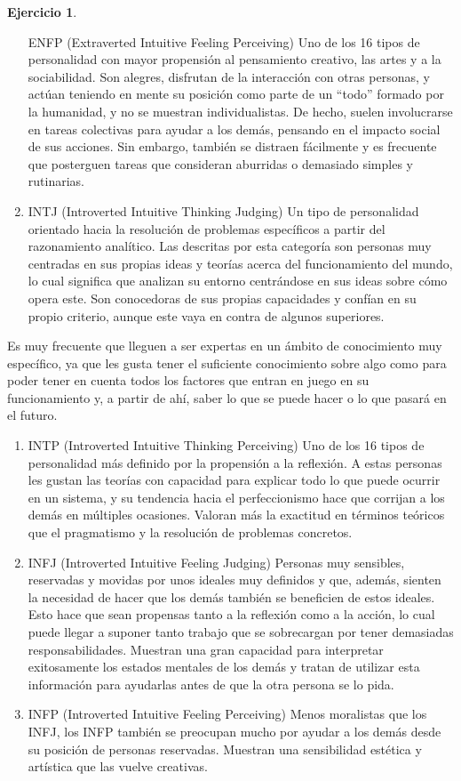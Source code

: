 \documentclass[
  10pt,
]{krantz}
\theoremstyle{definition}
\theoremstyle{definition}
\theoremstyle{definition}
\newtheorem{exercise}{Ejercicio}[chapter]
\theoremstyle{definition}
\theoremstyle{remark}
\begin{document}
\begin{exercise}
\begin{enumerate}
  ENFP (Extraverted Intuitive Feeling Perceiving)
  Uno de los 16 tipos de personalidad con mayor propensión al pensamiento creativo, las artes y a la sociabilidad. Son alegres, disfrutan de la interacción con otras personas, y actúan teniendo en mente su posición como parte de un ``todo'' formado por la humanidad, y no se muestran individualistas. De hecho, suelen involucrarse en tareas colectivas para ayudar a los demás, pensando en el impacto social de sus acciones. Sin embargo, también se distraen fácilmente y es frecuente que posterguen tareas que consideran aburridas o demasiado simples y rutinarias.
\item
  INTJ (Introverted Intuitive Thinking Judging)
  Un tipo de personalidad orientado hacia la resolución de problemas específicos a partir del razonamiento analítico. Las descritas por esta categoría son personas muy centradas en sus propias ideas y teorías acerca del funcionamiento del mundo, lo cual significa que analizan su entorno centrándose en sus ideas sobre cómo opera este. Son conocedoras de sus propias capacidades y confían en su propio criterio, aunque este vaya en contra de algunos superiores.
\end{enumerate}

Es muy frecuente que lleguen a ser expertas en un ámbito de conocimiento muy específico, ya que les gusta tener el suficiente conocimiento sobre algo como para poder tener en cuenta todos los factores que entran en juego en su funcionamiento y, a partir de ahí, saber lo que se puede hacer o lo que pasará en el futuro.

\begin{enumerate}
\def\labelenumi{\arabic{enumi}.}
\setcounter{enumi}{13}
\item
  INTP (Introverted Intuitive Thinking Perceiving)
  Uno de los 16 tipos de personalidad más definido por la propensión a la reflexión. A estas personas les gustan las teorías con capacidad para explicar todo lo que puede ocurrir en un sistema, y su tendencia hacia el perfeccionismo hace que corrijan a los demás en múltiples ocasiones. Valoran más la exactitud en términos teóricos que el pragmatismo y la resolución de problemas concretos.
\item
  INFJ (Introverted Intuitive Feeling Judging)
  Personas muy sensibles, reservadas y movidas por unos ideales muy definidos y que, además, sienten la necesidad de hacer que los demás también se beneficien de estos ideales. Esto hace que sean propensas tanto a la reflexión como a la acción, lo cual puede llegar a suponer tanto trabajo que se sobrecargan por tener demasiadas responsabilidades. Muestran una gran capacidad para interpretar exitosamente los estados mentales de los demás y tratan de utilizar esta información para ayudarlas antes de que la otra persona se lo pida.
\item
  INFP (Introverted Intuitive Feeling Perceiving)
  Menos moralistas que los INFJ, los INFP también se preocupan mucho por ayudar a los demás desde su posición de personas reservadas. Muestran una sensibilidad estética y artística que las vuelve creativas.
\end{enumerate}
\end{exercise}
\end{document}
